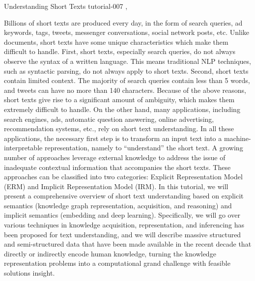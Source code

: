 \begin{tutorial}
  {Understanding Short Texts}
  {tutorial-007}
  {\daydateyear, \tutorialafternoontime}

Billions of short texts are produced every day, in the form of search queries, ad keywords, tags, tweets, messenger conversations, social network posts, etc. Unlike documents, short texts have some unique characteristics which make them difficult to handle. First, short texts, especially search queries, do not always observe the syntax of a written language. This means traditional NLP techniques, such as syntactic parsing, do not always apply to short texts. Second, short texts contain limited context. The majority of search queries contain less than 5 words, and tweets can have no more than 140 characters. Because of the above reasons, short texts give rise to a significant amount of ambiguity, which makes them extremely difficult to handle. On the other hand, many applications, including search engines, ads, automatic question answering, online advertising, recommendation systems, etc., rely on short text understanding. In all these applications, the necessary first step is to transform an input text into a machine-interpretable representation, namely to ``understand'' the short text. A growing number of approaches leverage external knowledge to address the issue of inadequate contextual information that accompanies the short texts. These approaches can be classified into two categories: Explicit Representation Model (ERM) and Implicit Representation Model (IRM). In this tutorial, we will present a comprehensive overview of short text understanding based on explicit semantics (knowledge graph representation, acquisition, and reasoning) and implicit semantics (embedding and deep learning). Specifically, we will go over various techniques in knowledge acquisition, representation, and inferencing has been proposed for text understanding, and we will describe massive structured and semi-structured data that have been made available in the recent decade that directly or indirectly encode human knowledge, turning the knowledge representation problems into a computational grand challenge with feasible solutions insight.
\end{tutorial}

